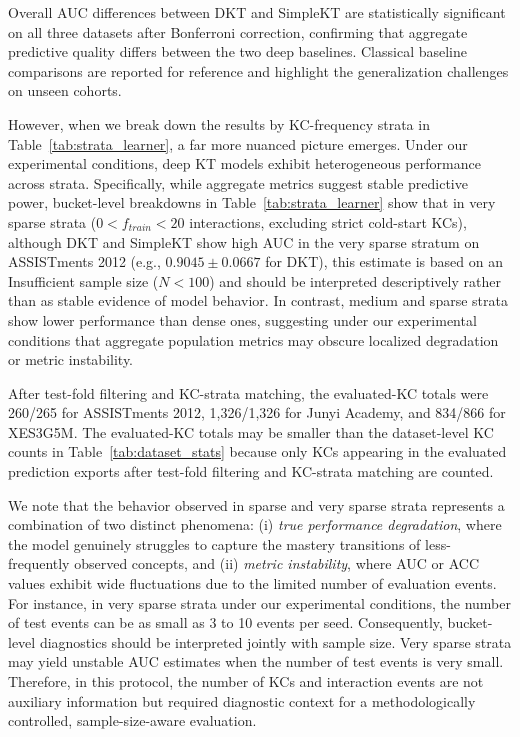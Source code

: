 



Overall AUC differences between DKT and SimpleKT are statistically significant on all three datasets after Bonferroni correction, confirming that aggregate predictive quality differs between the two deep baselines. Classical baseline comparisons are reported for reference and highlight the generalization challenges on unseen cohorts.

However, when we break down the results by KC-frequency strata in Table~\ref{tab:strata_learner}, a far more nuanced picture emerges. Under our experimental conditions, deep KT models exhibit heterogeneous performance across strata. Specifically, while aggregate metrics suggest stable predictive power, bucket-level breakdowns in Table~\ref{tab:strata_learner} show that in very sparse strata ($0 < f_{train} < 20$ interactions, excluding strict cold-start KCs), although DKT and SimpleKT show high AUC in the very sparse stratum on ASSISTments 2012 (e.g., $0.9045 \pm 0.0667$ for DKT), this estimate is based on an Insufficient sample size ($N < 100$) and should be interpreted descriptively rather than as stable evidence of model behavior. In contrast, medium and sparse strata show lower performance than dense ones, suggesting under our experimental conditions that aggregate population metrics may obscure localized degradation or metric instability.



After test-fold filtering and KC-strata matching, the evaluated-KC totals were 260/265 for ASSISTments 2012, 1,326/1,326 for Junyi Academy, and 834/866 for XES3G5M. The evaluated-KC totals may be smaller than the dataset-level KC counts in Table~\ref{tab:dataset_stats} because only KCs appearing in the evaluated prediction exports after test-fold filtering and KC-strata matching are counted.

We note that the behavior observed in sparse and very sparse strata represents a combination of two distinct phenomena: (i) \textit{true performance degradation}, where the model genuinely struggles to capture the mastery transitions of less-frequently observed concepts, and (ii) \textit{metric instability}, where AUC or ACC values exhibit wide fluctuations due to the limited number of evaluation events. For instance, in very sparse strata under our experimental conditions, the number of test events can be as small as 3 to 10 events per seed. Consequently, bucket-level diagnostics should be interpreted jointly with sample size. Very sparse strata may yield unstable AUC estimates when the number of test events is very small. Therefore, in this protocol, the number of KCs and interaction events are not auxiliary information but required diagnostic context for a methodologically controlled, sample-size-aware evaluation.

